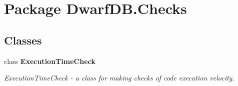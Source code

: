 \hypertarget{namespace_dwarf_d_b_1_1_checks}{
\section{Package DwarfDB.Checks}
\label{namespace_dwarf_d_b_1_1_checks}
}
\subsection*{Classes}
\begin{DoxyCompactItemize}
\item 
class {\bfseries ExecutionTimeCheck}
\begin{DoxyCompactList}\small\item\em ExecutionTimeCheck -\/ a class for making checks of code execution velocity. \item\end{DoxyCompactList}\end{DoxyCompactItemize}
